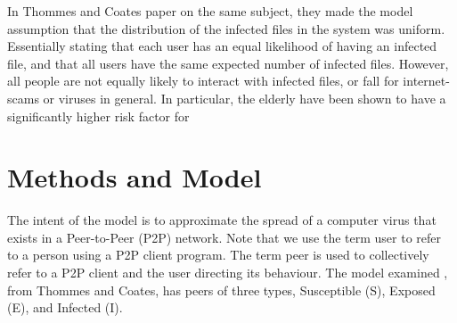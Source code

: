 \documentclass[12pt, oneside]{article}
\begin{document}
        In Thommes and Coates paper on the same subject, they made the model assumption that the distribution of the infected files in the system was uniform. Essentially
        stating that each user has an equal likelihood of having an infected file, and that all users have the same expected number of infected files. However, all people are not equally
        likely to interact with infected files, or fall for internet-scams or viruses in general. In particular, the elderly have been shown to have a significantly higher risk factor for 

    \section{Methods and Model}
    
        The intent of the model is to approximate the spread of a computer virus that exists in a Peer-to-Peer (P2P) network. Note that we use the term user
        to refer to a person using a P2P client program. The term peer is used to collectively refer to a P2P client and the user directing its behaviour.
        The model examined \cite{1689197}, from Thommes and Coates, has peers of three types, Susceptible (S), Exposed (E), and Infected (I). 
\end{document}

